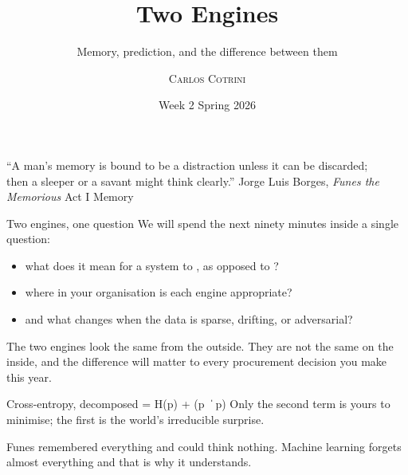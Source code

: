\documentclass[aspectratio=169,11pt]{beamer}
\title{Two Engines}
\subtitle{Memory, prediction, and the difference between them}
\author{\textsc{Carlos Cotrini}}
\institute{ETH Zürich \,|\, CAS AINIT FS26}
\date{Week 2 \textemdash{} Spring 2026}
\renewcommand{\AINITsection}{}
\begin{document}
\AINITmaketitle

\sectiondivider%
  {``A man's memory is bound to be a distraction unless it can be discarded;\\ then a sleeper or a savant might think clearly.''}%
  {Jorge Luis Borges, \textit{Funes the Memorious}}%
  {Act I \textemdash{} Memory}

\renewcommand{\AINITsection}{Act I \textemdash{} Memory}
\begin{frame}{Two engines, one question}
  We will spend the next ninety minutes inside a single question:

  \begin{itemize}
    \item what does it mean for a system to , as opposed to ?
    \item where in your organisation is each engine appropriate?
    \item and what changes when the data is sparse, drifting, or adversarial?
  \end{itemize}

  The two engines look the same from the outside. They are not the same on the inside, and the difference will matter to every procurement decision you make this year.
\end{frame}

\renewcommand{\AINITsection}{Act II \textemdash{} Prediction}
\equationslide%
  {Cross-entropy, decomposed}%
  { \;=\; H(p) \;+\; {\color{accentOxblood}\!\left(p \,\|\, \hat p\right)}}%
  {Only the second term is yours to minimise; the first is the world's irreducible surprise.}


\renewcommand{\AINITsection}{}
\closingslide%
  {Funes remembered everything and could think nothing.}%
  {Machine learning forgets almost everything \textemdash{} and that is why it understands.}
\end{document}
